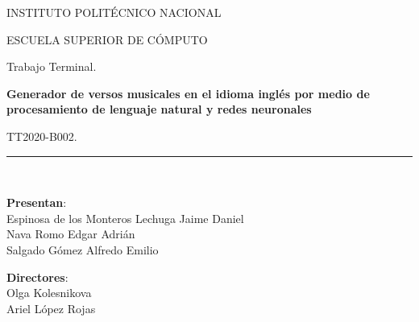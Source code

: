 \documentclass[12pt, a4paper, titlepage]{report}
\begin{document}
\begin{titlepage}
\vspace*{.25cm}								%
		
		\begin{center}
			
			\begin{LARGE}
				\textcolor{guindapoli}{INSTITUTO POLITÉCNICO NACIONAL}\\
			\end{LARGE}	
			
			\vspace*{0.2in}
			
			\begin{Large}
				\textcolor{azulescom}{ESCUELA SUPERIOR DE CÓMPUTO}\\
			\end{Large}		
			
			\vspace*{0.4in}
			
			\begin{large}
				Trabajo Terminal.\\
			\end{large}
			
			\vspace*{0.2in}
			
			\begin{Large}
				\textbf{Generador de versos musicales en el idioma
inglés por medio de procesamiento de lenguaje
natural y redes neuronales}\\
			\end{Large}
			
			\vspace*{0.2in}
			
			\begin{large}
				TT2020-B002.\\
			\end{large}
			
			\vspace*{0.2in}
			
			\rule{80mm}{.1mm}\\
			\vspace*{0.1in}
			
			\begin{large}
				\begin{center}
					\textbf{Presentan}:\\
					Espinosa de los Monteros Lechuga Jaime Daniel\\
					Nava Romo Edgar Adrián\\
					Salgado Gómez Alfredo Emilio\\
				\end{center}
			\end{large}
			
			\begin{large}
				\textbf{Directores}:\\
				Olga Kolesnikova\\
				Ariel López Rojas\\
			\end{large}
			
		\end{center}
	
	\end{titlepage}
\end{document}
